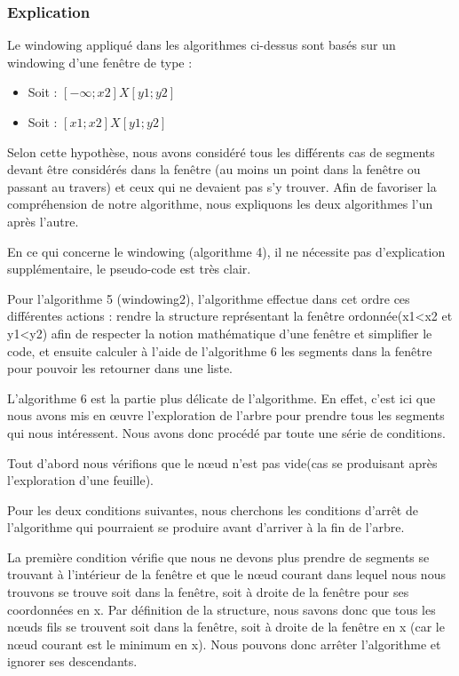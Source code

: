 \documentclass[10pt,a4paper]{article}
\begin{document}
\subsubsection{Explication}

Le windowing appliqué dans les algorithmes ci-dessus sont basés sur un windowing d'une fenêtre de type : \begin{itemize}
\item Soit : $[-\infty;x2]X[y1;y2]$
\item Soit : $[x1;x2]X[y1;y2]$
\end{itemize}
Selon cette hypothèse, nous avons considéré tous les différents cas de segments devant être considérés dans la fenêtre (au moins un point dans la fenêtre ou passant au travers) et ceux qui ne devaient pas s'y trouver. Afin de favoriser la compréhension de notre algorithme, nous expliquons les deux algorithmes l'un après l'autre.

En ce qui concerne le windowing (algorithme 4), il ne nécessite pas d'explication supplémentaire, le pseudo-code est très clair. 

Pour l'algorithme 5 (windowing2), l'algorithme effectue dans cet ordre ces différentes actions : rendre la structure représentant la fenêtre ordonnée(x1<x2 et y1<y2) afin de respecter la notion mathématique d'une fenêtre et simplifier le code, et ensuite calculer à l'aide de l'algorithme 6 les segments dans la fenêtre pour pouvoir les retourner dans une liste.

L'algorithme 6 est la partie plus délicate de l'algorithme. En effet, c'est ici que nous avons mis en œuvre l'exploration de l'arbre pour prendre tous les segments qui nous intéressent. Nous avons donc procédé par toute une série de conditions.

Tout d'abord nous vérifions que le nœud n'est pas vide(cas se produisant après l'exploration d'une feuille).

Pour les deux conditions suivantes, nous cherchons les conditions d'arrêt de l'algorithme qui pourraient se produire avant d'arriver à la fin de l'arbre. 

La première condition vérifie que nous ne devons plus prendre de segments se trouvant à l'intérieur de la fenêtre et que le nœud courant dans lequel nous nous trouvons se trouve soit dans la fenêtre, soit à droite de la fenêtre pour ses coordonnées en x. Par définition de la structure, nous savons donc que tous les nœuds fils se trouvent soit dans la fenêtre, soit à droite de la fenêtre en x (car le nœud courant est le minimum en x). Nous pouvons donc arrêter l'algorithme et ignorer ses descendants.
\end{document}
